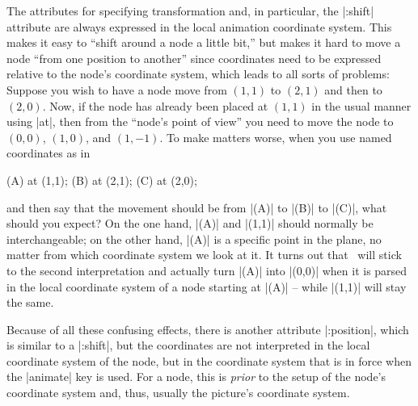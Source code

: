 The attributes for specifying transformation and, in particular, the
|:shift| attribute are always expressed in the local animation
coordinate system. This makes it easy to ``shift around a node a
little bit,'' but makes it hard to move a node ``from one position to
another'' since coordinates need to be expressed relative to the node's
coordinate system, which leads to all sorts of problems: Suppose you
wish to have a node move from $(1,1)$ to $(2,1)$ and then to
$(2,0)$. Now, if the node has already been placed at $(1,1)$ in the
usual manner using |at|, then from the ``node's point of view'' you
need to move the node to $(0,0)$, $(1,0)$, and $(1,-1)$. To make
matters worse, when you use named coordinates as in
\begin{codeexample}
\coordinate(A) at (1,1);
\coordinate(B) at (2,1);
\coordinate(C) at (2,0);
\end{codeexample}
and then say that the movement should be from |(A)| to |(B)| to |(C)|,
what should you expect? On the one hand, |(A)| and |(1,1)| should
normally be interchangeable; on the other hand, |(A)| is a specific
point in the plane, no matter from which coordinate system we look at
it. It turns out that \tikzname\ will stick to the second
interpretation and actually turn |(A)| into |(0,0)| when it is parsed
in the local coordinate system of a node starting at |(A)| -- while
|(1,1)| will stay the same.

Because of all these confusing effects, there is another attribute
|:position|, which is similar to a |:shift|, but the coordinates are
not interpreted in the local coordinate system of the node, but in the
coordinate system that is in force when the |animate| key is used. For
a node, this is \emph{prior} to the setup of the node's coordinate
system and, thus, usually the picture's coordinate system.  

